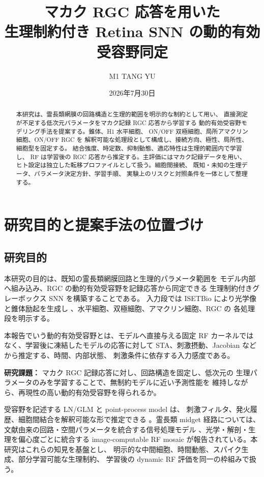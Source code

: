 \documentclass[a4paper,10pt,twocolumn,uplatex,dvipdfmx]{jsarticle}
\title{\textbf{マカク RGC 応答を用いた\\
生理制約付き Retina SNN の動的有効受容野同定}}
\author{M1 TANG YU}
\date{2026年7月30日}
\begin{document}
\maketitle

\begin{abstract}
本研究は、霊長類網膜の回路構造と生理的範囲を明示的な制約として用い、
直接測定が不足する低次元パラメータをマカク記録 RGC 応答から学習する
動的有効受容野モデリング手法を提案する。錐体、H1 水平細胞、
ON/OFF 双極細胞、局所アマクリン細胞、ON/OFF RGC を
解釈可能な処理段として構成し、接続方向、極性、局所性、細胞型を固定する。
結合強度、時定数、抑制動態、適応特性は生理的範囲内で学習し、
RF は学習後の RGC 応答から推定する。主評価にはマカク記録データを用い、
ヒト設定は独立した転移プロファイルとして扱う。細胞間接続、
既知・未知の生理データ、パラメータ決定方針、学習手順、
実験上のリスクと対照条件を一体として整理する。
\end{abstract}


\section{研究目的と提案手法の位置づけ}

\subsection{研究目的}

本研究の目的は、既知の霊長類網膜回路と生理的パラメータ範囲を
モデル内部へ組み込み、RGC の動的有効受容野を記録応答から同定できる
生理制約付きグレーボックス SNN を構築することである。
入力段では ISETBio により光学像と錐体励起を生成し
\cite{brainard2015}、水平細胞、双極細胞、アマクリン細胞、RGC の
各処理段を明示する。

本報告でいう動的有効受容野とは、モデルへ直接与える固定 RF
カーネルではなく、学習後に凍結したモデルの応答に対して
STA、刺激摂動、Jacobian などから推定する、時間、内部状態、
刺激条件に依存する入力感度である。

\noindent\textbf{研究課題：}
マカク RGC 記録応答に対し、回路構造を固定し、低次元の
生理パラメータのみを学習することで、無制約モデルに近い予測性能を
維持しながら、再現性の高い動的有効受容野を得られるか。

受容野を記述する LN/GLM と point-process model は、
刺激フィルタ、発火履歴、細胞間結合を解釈可能な形で推定できる
\cite{pillow2008}。霊長類 midget 経路については、
文献由来の回路・空間パラメータを統合する信号処理モデル
\cite{somaratna2025}、光学・解剖・生理を偏心度ごとに統合する
image-computable RF mosaic
\cite{cottaris2026} が報告されている。本研究はこれらの知見を基盤とし、
明示的な中間細胞、時間動態、スパイク生成、部分学習可能な生理制約、
学習後の dynamic RF 評価を同一の枠組みで扱う。
\end{document}
